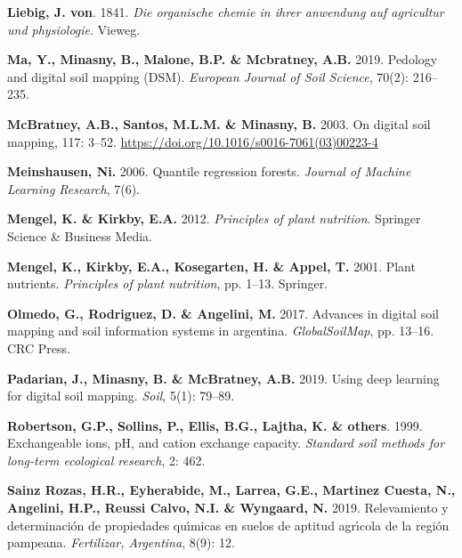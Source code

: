 \documentclass[
  10pt,
  b5paper,
  oneside]{book}
\newlength{\cslhangindent}
\newlength{\cslentryspacingunit} %
\newenvironment{CSLReferences}[2] %
 {%
  \setlength{\parindent}{0pt}
  \ifodd #1
  \let\oldpar\par
  \def\par{\hangindent=\cslhangindent\oldpar}
  \fi
  \setlength{\parskip}{#2\cslentryspacingunit}
 }%
 {}
\begin{document}
\begin{CSLReferences}{0}{0}
\leavevmode{}%
\textbf{Liebig, J. von}. 1841. \emph{Die organische chemie in ihrer anwendung auf agricultur und physiologie}. Vieweg.

\leavevmode{}%
\textbf{Ma, Y., Minasny, B., Malone, B.P. \& Mcbratney, A.B.} 2019. Pedology and digital soil mapping (DSM). \emph{European Journal of Soil Science}, 70(2): 216--235.

\leavevmode{}%
\textbf{McBratney, A.B., Santos, M.L.M. \& Minasny, B.} 2003. On digital soil mapping, 117: 3--52. \url{https://doi.org/10.1016/s0016-7061(03)00223-4}

\leavevmode{}%
\textbf{Meinshausen, Ni.} 2006. Quantile regression forests. \emph{Journal of Machine Learning Research}, 7(6).

\leavevmode{}%
\textbf{Mengel, K. \& Kirkby, E.A.} 2012. \emph{Principles of plant nutrition}. Springer Science \& Business Media.

\leavevmode{}%
\textbf{Mengel, K., Kirkby, E.A., Kosegarten, H. \& Appel, T.} 2001. Plant nutrients. \emph{Principles of plant nutrition}, pp. 1--13. Springer.

\leavevmode{}%
\textbf{Olmedo, G., Rodriguez, D. \& Angelini, M.} 2017. Advances in digital soil mapping and soil information systems in argentina. \emph{GlobalSoilMap}, pp. 13--16. CRC Press.

\leavevmode{}%
\textbf{Padarian, J., Minasny, B. \& McBratney, A.B.} 2019. Using deep learning for digital soil mapping. \emph{Soil}, 5(1): 79--89.

\leavevmode{}%
\textbf{Robertson, G.P., Sollins, P., Ellis, B.G., Lajtha, K. \& others}. 1999. Exchangeable ions, pH, and cation exchange capacity. \emph{Standard soil methods for long-term ecological research}, 2: 462.

\leavevmode{}%
\textbf{Sainz Rozas, H.R., Eyherabide, M., Larrea, G.E., Martinez Cuesta, N., Angelini, H.P., Reussi Calvo, N.I. \& Wyngaard, N.} 2019. Relevamiento y determinaci{ó}n de propiedades qu{ı́}micas en suelos de aptitud agr{ı́}cola de la regi{ó}n pampeana. \emph{Fertilizar, Argentina}, 8(9): 12.


\end{CSLReferences}
\end{document}

